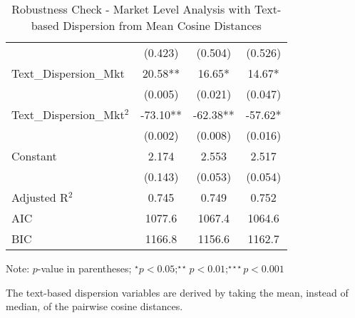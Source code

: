 \begin{table}[]
\begin{threeparttable}[t]
\begin{tabular}{@{}lccc@{}}
                                                 & (0.423)            & (0.504)            & (0.526)            \\
Text\_Dispersion\_Mkt                            & 20.58**            & 16.65*             & 14.67*             \\
                                                 & (0.005)            & (0.021)            & (0.047)            \\
Text\_Dispersion\_Mkt$^2$ & -73.10**           & -62.38**           & -57.62*            \\
                                                 & (0.002)            & (0.008)            & (0.016)            \\
Constant                                         & 2.174              & 2.553              & 2.517              \\
                                                 & (0.143)            & (0.053)            & (0.054)            \\
Adjusted R$^2$                                               & 0.745              & 0.749              & 0.752              \\
AIC                                              & 1077.6             & 1067.4             & 1064.6             \\
BIC                                              & 1166.8             & 1156.6             & 1162.7             \\ \bottomrule
\end{tabular}%
\begin{tablenotes}
\item Note: $p$-value in parentheses; $^\star p<0.05;^{\star\star} p<0.01;^{\star\star\star} p<0.001 $
\item The text-based dispersion variables are derived by taking the mean, instead of median, of the pairwise cosine distances.
\end{tablenotes}
\end{threeparttable}
\vspace{10pt}
\caption{Robustness Check - Market Level Analysis with Text-based Dispersion from Mean Cosine Distances}
\label{reg_mkt_rob_text_mean}
\end{table} 